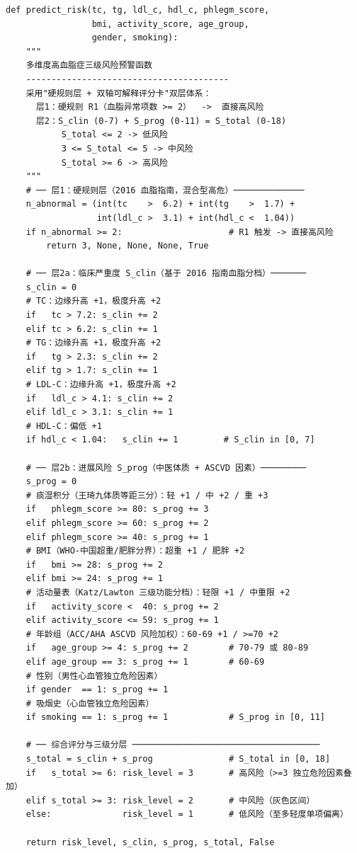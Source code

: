 \begin{lstlisting}[caption={风险预警模型核心函数 \texttt{predict\_risk()}},
                   label={lst:predict-risk}]
def predict_risk(tc, tg, ldl_c, hdl_c, phlegm_score,
                 bmi, activity_score, age_group,
                 gender, smoking):
    """
    多维度高血脂症三级风险预警函数
    ----------------------------------------
    采用"硬规则层 + 双轴可解释评分卡"双层体系：
      层1：硬规则 R1（血脂异常项数 >= 2）  ->  直接高风险
      层2：S_clin (0-7) + S_prog (0-11) = S_total (0-18)
           S_total <= 2 -> 低风险
           3 <= S_total <= 5 -> 中风险
           S_total >= 6 -> 高风险
    """
    # ── 层1：硬规则层（2016 血脂指南，混合型高危）──────────────
    n_abnormal = (int(tc    >  6.2) + int(tg    >  1.7) +
                  int(ldl_c >  3.1) + int(hdl_c <  1.04))
    if n_abnormal >= 2:                     # R1 触发 -> 直接高风险
        return 3, None, None, None, True

    # ── 层2a：临床严重度 S_clin（基于 2016 指南血脂分档）───────
    s_clin = 0
    # TC：边缘升高 +1，极度升高 +2
    if   tc > 7.2: s_clin += 2
    elif tc > 6.2: s_clin += 1
    # TG：边缘升高 +1，极度升高 +2
    if   tg > 2.3: s_clin += 2
    elif tg > 1.7: s_clin += 1
    # LDL-C：边缘升高 +1，极度升高 +2
    if   ldl_c > 4.1: s_clin += 2
    elif ldl_c > 3.1: s_clin += 1
    # HDL-C：偏低 +1
    if hdl_c < 1.04:   s_clin += 1         # S_clin in [0, 7]

    # ── 层2b：进展风险 S_prog（中医体质 + ASCVD 因素）─────────
    s_prog = 0
    # 痰湿积分（王琦九体质等距三分）：轻 +1 / 中 +2 / 重 +3
    if   phlegm_score >= 80: s_prog += 3
    elif phlegm_score >= 60: s_prog += 2
    elif phlegm_score >= 40: s_prog += 1
    # BMI（WHO-中国超重/肥胖分界）：超重 +1 / 肥胖 +2
    if   bmi >= 28: s_prog += 2
    elif bmi >= 24: s_prog += 1
    # 活动量表（Katz/Lawton 三级功能分档）：轻限 +1 / 中重限 +2
    if   activity_score <  40: s_prog += 2
    elif activity_score <= 59: s_prog += 1
    # 年龄组（ACC/AHA ASCVD 风险加权）：60-69 +1 / >=70 +2
    if   age_group >= 4: s_prog += 2        # 70-79 或 80-89
    elif age_group == 3: s_prog += 1        # 60-69
    # 性别（男性心血管独立危险因素）
    if gender  == 1: s_prog += 1
    # 吸烟史（心血管独立危险因素）
    if smoking == 1: s_prog += 1            # S_prog in [0, 11]

    # ── 综合评分与三级分层 ─────────────────────────────────────
    s_total = s_clin + s_prog               # S_total in [0, 18]
    if   s_total >= 6: risk_level = 3       # 高风险（>=3 独立危险因素叠加）
    elif s_total >= 3: risk_level = 2       # 中风险（灰色区间）
    else:              risk_level = 1       # 低风险（至多轻度单项偏离）

    return risk_level, s_clin, s_prog, s_total, False
\end{lstlisting}

